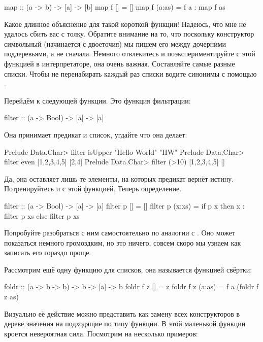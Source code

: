 \begin{code}
map :: (a -> b) -> [a] -> [b]
map f []     = []
map f (a:as) = f a : map f as
\end{code}

Какое длинное объяснение для такой короткой функции! Надеюсь, что
мне не удалось сбить вас с толку. Обратите внимание на то, 
что поскольку конструктор символьный (начинается с двоеточия) 
мы пишем его между дочерними поддеревьями, а не сначала.
Немного отвлекитесь
и поэкспериментируйте с этой функцией в интерпретаторе,
она очень важная. Составляйте самые разные списки.
Чтобы не перенабирать каждый раз списки водите
синонимы с помощью .

Перейдём к следующей функции. Это функция фильтрации:

\begin{code}
filter :: (a -> Bool) -> [a] -> [a]
\end{code}

Она принимает предикат и список, угдайте что она делает:

\begin{code}
Prelude Data.Char> filter isUpper "Hello World"
"HW"
Prelude Data.Char> filter even [1,2,3,4,5]
[2,4]
Prelude Data.Char> filter (>10) [1,2,3,4,5]
[]
\end{code}

Да, она оставляет лишь те элементы, на которых
предикат вернёт истину. Потренируйтесь и с этой функцией.
Теперь определение.

\begin{code}
filter :: (a -> Bool) -> [a] -> [a]
filter p []     = []
filter p (x:xs) = if p x then x : filter p xs else filter p xs
\end{code}

Попробуйте разобраться с ним самостоятельно по аналогии
с . Оно может показаться немного громоздким,
но это ничего, совсем скоро мы узнаем как записать
его гораздо проще. 

Рассмотрим ещё одну функцию для списков, она называется функцией свёртки:

\begin{code}
foldr :: (a -> b -> b) -> b -> [a] -> b
foldr f z []     = z
foldr f z (a:as) = f a (foldr f z as)
\end{code}

Визуально её действие можно представить как замену 
всех конструкторов в дереве значения на подходящие
по типу функции. В этой маленькой функции кроется 
невероятная сила. Посмотрим на несколько примеров:

